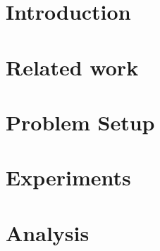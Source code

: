 \documentclass[letterpaper]{article}
\begin{document}
\begin{abstract}
\begin{quote}








\end{quote}
\end{abstract}

\section{Introduction}
\label{intro}


\section{Related work}
\label{related-work}


\section{Problem Setup}
\label{problem}


\section{Experiments}
\label{experiments}


\section{Analysis}
\label{analysis}





\newpage






 

\end{document}
